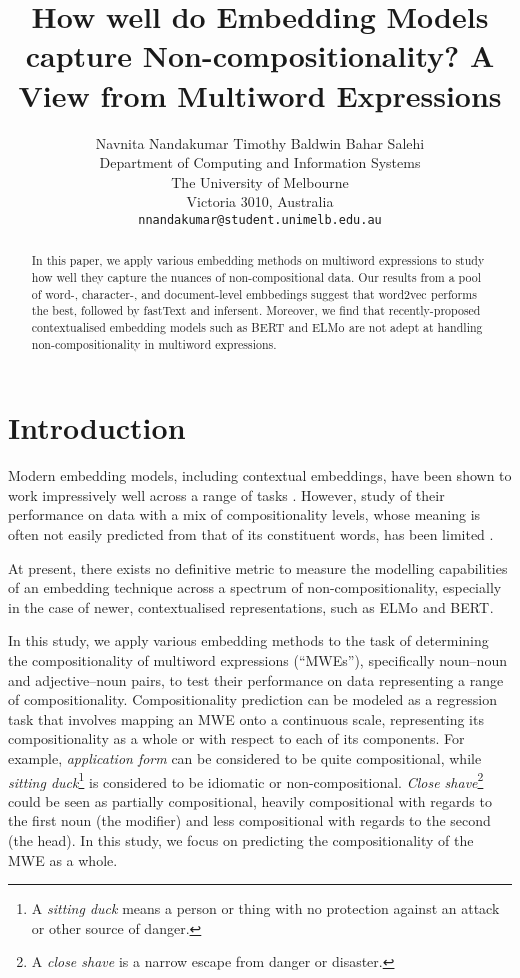 \documentclass[11pt,a4paper]{article}
\title{How well do Embedding Models capture Non-compositionality? A View
from Multiword Expressions}
\author{Navnita Nandakumar \qquad
  Timothy Baldwin \qquad
  Bahar Salehi\\
	Department of Computing and Information Systems \\
The University of Melbourne \\
Victoria 3010, Australia \\
  {\tt nnandakumar@student.unimelb.edu.au} \qquad {\tt \{tbaldwin|salehi.b\}@unimelb.edu.au}   \\
}
\date{}
\newcommand{\lex}[1]{\textit{#1}\xspace}
\newcommand{\embmethod}[2][]{\textsf{#2}$_{\text{#1}}$\xspace}
\newcommand{\wordtovec}{\embmethod{word2vec}}
\newcommand{\infersent}[1][]{\embmethod[#1]{infersent}}
\newcommand{\elmo}{\embmethod{ELMo}}
\newcommand{\fasttext}{\embmethod{fastText}}
\newcommand{\bert}{\embmethod{BERT}}
\begin{document}
\maketitle

\begin{abstract}
  In this paper, we apply various embedding methods on multiword
  expressions to study how well they capture the nuances of
  non-compositional data. Our results from a pool of word-, character-,
  and document-level embbedings suggest that \wordtovec performs the
  best, followed by \fasttext and \infersent. Moreover, we find that recently-proposed contextualised embedding models such as \bert and \elmo are not adept at handling non-compositionality in multiword expressions. 
\end{abstract}

\section{Introduction}
Modern embedding models, including contextual embeddings, have been shown to work impressively well across a range of tasks \cite{Peters2018,Devlin2018}. However, study of their performance on data with a mix of compositionality levels, whose meaning is often not easily predicted from that of its constituent words, has been limited \cite{Salehi2015,Hakimi2018,Nanda2018}. 

At present, there exists no definitive metric to measure the modelling capabilities of an embedding technique across a spectrum of non-compositionality, especially in the case of newer, contextualised representations, such as \elmo and \bert.

In this study, we apply various embedding methods to the task of determining the compositionality of multiword expressions (``MWEs''), specifically noun--noun and adjective--noun pairs, to test their performance on data representing a range of compositionality. Compositionality prediction can be modeled as a regression task \cite{Baldwin2010} that involves mapping an MWE onto a continuous scale, representing its compositionality as a whole or with respect to each of its components. For example, \lex{application form} can be considered to be quite compositional, while \lex{sitting duck}\footnote{A \lex{sitting duck} means a person or thing with no protection against an attack or other source of danger.} is considered to be idiomatic or non-compositional. \lex{Close shave}\footnote{A \lex{close shave} is a narrow escape from danger or disaster.} could be seen as partially compositional, heavily compositional with regards to the first noun (the modifier) and less compositional with regards to the second (the head). In this study, we focus on predicting the compositionality of the MWE as a whole.
\end{document}
